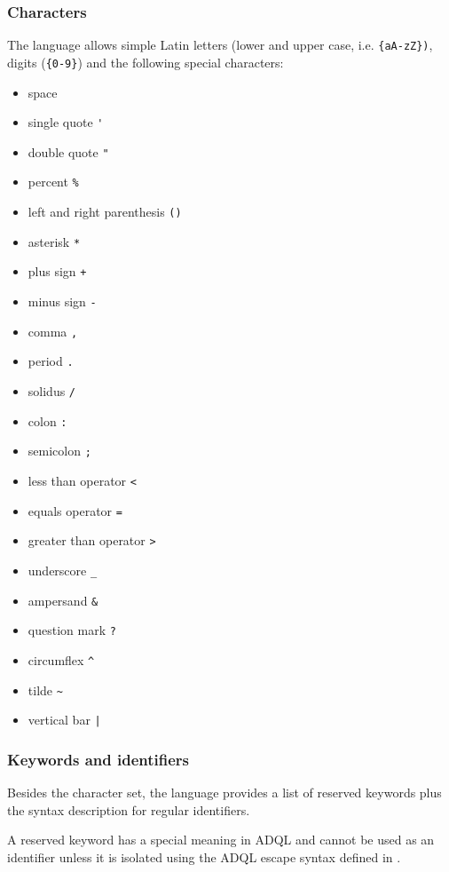\documentclass[11pt,a4paper]{ivoa}
\begin{document}
\subsubsection{Characters}
\label{sec:characters}

The language allows simple Latin letters (lower and upper case, i.e.
\verb:{aA-zZ}):, digits (\verb:{0-9}:) and the following special characters:

\begin{itemize}
    \item space
    \item single quote \verb:':
    \item double quote \verb:":
    \item percent \verb:%:
    \item left and right parenthesis \verb:():
    \item asterisk \verb:*:
    \item plus sign \verb:+:
    \item minus sign \verb:-:
    \item comma \verb:,:
    \item period \verb:.:
    \item solidus \verb:/:
    \item colon \verb.:.
    \item semicolon \verb:;:
    \item less than operator \verb:<:
    \item equals operator \verb:=:
    \item greater than operator \verb:>:
    \item underscore \verb:_:
    \item ampersand \verb:&:
    \item question mark \verb:?:
    \item circumflex \verb:^:
    \item tilde \verb:~:
    \item vertical bar \verb:|:
\end{itemize}

\subsubsection{Keywords and identifiers}
\label{sec:keywords}

Besides the character set, the language provides a list of reserved keywords
plus the syntax description for regular identifiers.

A reserved keyword has a special meaning in ADQL and cannot be used as
an identifier unless it is isolated using the ADQL escape syntax defined
in .
\end{document}
